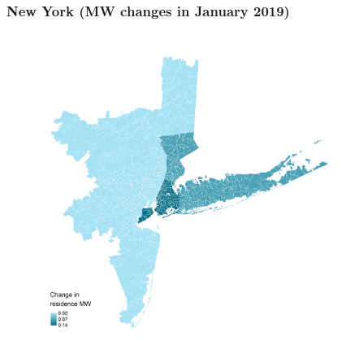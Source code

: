 \documentclass[aspectratio=169, t]{beamer}
\begin{document}
\begin{frame}[label = nyc_example]
\frametitle{New York (MW changes in January 2019)}
    \begin{columns}
        \begin{column}{0.50\textwidth}
            \vspace{-4mm}
            \begin{figure}
                \centering
                \includegraphics[scale = 0.36]{maps_events/output/nyc_2018-12_statutory_mw.png}
            \end{figure}   
        \end{column}
        \begin{column}{0.50\textwidth}
            \vspace{-4mm}
            \begin{figure}
                \centering

\end{figure}
\end{column}
\end{columns}
\end{frame}
\end{document}
